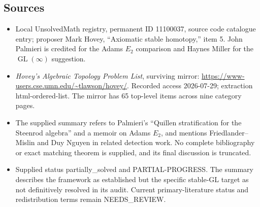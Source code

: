 \documentclass[11pt]{article}
\begin{document}
\subsection{Sources}
\begin{itemize}
\item Local UnsolvedMath registry, permanent ID 11100037, source code catalogue entry; proposer Mark Hovey, ``Axiomatic stable homotopy,'' item 5. John Palmieri is credited for the Adams \(E_2\) comparison and Haynes Miller for the \(\operatorname{GL}(\infty)\) suggestion.
\item \emph{Hovey's Algebraic Topology Problem List}, surviving mirror: \url{https://www-users.cse.umn.edu/~tlawson/hovey/}. Recorded access 2026-07-29; extraction html-ordered-list. The mirror has 65 top-level items across nine category pages.
\item The supplied summary refers to Palmieri's ``Quillen stratification for the Steenrod algebra'' and a memoir on Adams \(E_2\), and mentions Friedlander--Mislin and Duy Nguyen in related detection work. No complete bibliography or exact matching theorem is supplied, and its final discussion is truncated.
\item Supplied status partially\_solved and PARTIAL-PROGRESS. The summary describes the framework as established but the specific stable-GL target as not definitively resolved in its audit. Current primary-literature status and redistribution terms remain NEEDS\_REVIEW.
\end{itemize}
\end{document}
